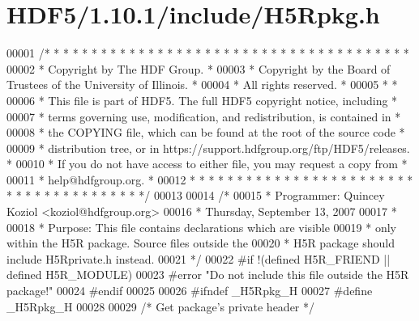 \hypertarget{_h_d_f5_21_810_81_2include_2_h5_rpkg_8h_source}{}\section{H\+D\+F5/1.10.1/include/\+H5\+Rpkg.h}
\label{_h_d_f5_21_810_81_2include_2_h5_rpkg_8h_source}

\begin{DoxyCode}
00001 \textcolor{comment}{/* * * * * * * * * * * * * * * * * * * * * * * * * * * * * * * * * * * * * * *}
00002 \textcolor{comment}{ * Copyright by The HDF Group.                                               *}
00003 \textcolor{comment}{ * Copyright by the Board of Trustees of the University of Illinois.         *}
00004 \textcolor{comment}{ * All rights reserved.                                                      *}
00005 \textcolor{comment}{ *                                                                           *}
00006 \textcolor{comment}{ * This file is part of HDF5.  The full HDF5 copyright notice, including     *}
00007 \textcolor{comment}{ * terms governing use, modification, and redistribution, is contained in    *}
00008 \textcolor{comment}{ * the COPYING file, which can be found at the root of the source code       *}
00009 \textcolor{comment}{ * distribution tree, or in https://support.hdfgroup.org/ftp/HDF5/releases.  *}
00010 \textcolor{comment}{ * If you do not have access to either file, you may request a copy from     *}
00011 \textcolor{comment}{ * help@hdfgroup.org.                                                        *}
00012 \textcolor{comment}{ * * * * * * * * * * * * * * * * * * * * * * * * * * * * * * * * * * * * * * */}
00013 
00014 \textcolor{comment}{/*}
00015 \textcolor{comment}{ * Programmer: Quincey Koziol <koziol@hdfgroup.org>}
00016 \textcolor{comment}{ *             Thursday, September 13, 2007}
00017 \textcolor{comment}{ *}
00018 \textcolor{comment}{ * Purpose:     This file contains declarations which are visible}
00019 \textcolor{comment}{ *              only within the H5R package. Source files outside the}
00020 \textcolor{comment}{ *              H5R package should include H5Rprivate.h instead.}
00021 \textcolor{comment}{ */}
00022 \textcolor{preprocessor}{#if !(defined H5R\_FRIEND || defined H5R\_MODULE)}
00023 \textcolor{preprocessor}{#error "Do not include this file outside the H5R package!"}
00024 \textcolor{preprocessor}{#endif}
00025 
00026 \textcolor{preprocessor}{#ifndef \_H5Rpkg\_H}
00027 \textcolor{preprocessor}{#define \_H5Rpkg\_H}
00028 
00029 \textcolor{comment}{/* Get package's private header */}

\end{DoxyCode}
